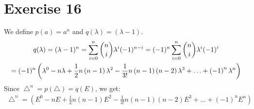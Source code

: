\section{Exercise 16}
We define $p(a) = a^n$ and $q(\lambda) = (\lambda -1 )$.
\begin{gather*}
q(\lambda) = (\lambda -1 ) ^ n = \sum\limits_{i=0}^n \dbinom{n}{i}\lambda ^i (-1)^{n-i} = (-1)^{n} \sum\limits_{i=0}^n \dbinom{n}{i}\lambda ^i (-1)^i \\ 
= (-1)^n \left( \lambda ^0 - n\lambda + \frac{1}{2} n \left( n-1 \right) \lambda^2 - \frac{1}{3!} n \left( n-1 \right) \left(n-2 \right)\lambda^3 + \ldots + \left(-1 \right)^n \lambda^n \right)
\end{gather*}
Since $\bigtriangleup^n = p(\bigtriangleup) = q(E) $, we get:
\begin{gather*}
\bigtriangleup ^n = \left( E^0 - nE + \frac{1}{2} n(n-1) E^2 - \frac{1}{3!} n(n-1)(n-2)E^3 + \ldots + (-1)^n E^n \right)
\end{gather*}
